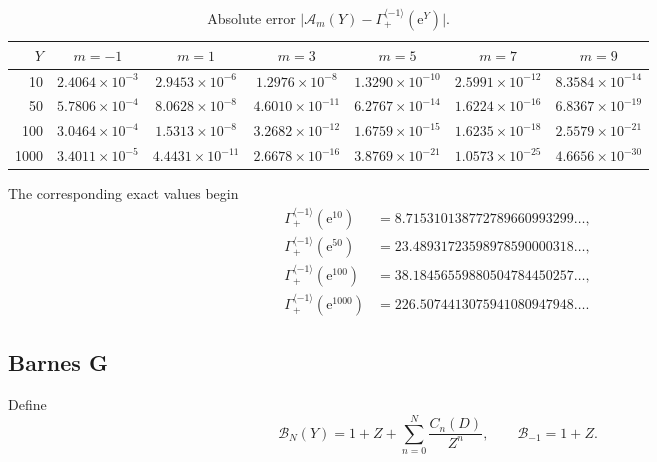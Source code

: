 \documentclass[11pt,a4paper]{article}
\numberwithin{equation}{section}
\theoremstyle{definition}
\theoremstyle{remark}
\newcommand{\e}{\mathrm e}
\newcommand{\cinv}{\langle-1\rangle}
\begin{document}
\begin{table}[htbp]
\centering
\caption{Absolute error \(\lvert\mathcal A_m(Y)-\Gamma_+^{\cinv}(\e^Y)\rvert\).}
\label{tab:gamma-errors}
\scriptsize
\setlength{\tabcolsep}{3.2pt}
\begin{tabular}{rcccccc}
\toprule
\(Y\) & \(m=-1\) & \(m=1\) & \(m=3\) & \(m=5\) & \(m=7\) & \(m=9\)\\
\midrule
10
& \(2.4064\!\times10^{-3}\) & \(2.9453\!\times10^{-6}\)
& \(1.2976\!\times10^{-8}\) & \(1.3290\!\times10^{-10}\)
& \(2.5991\!\times10^{-12}\) & \(8.3584\!\times10^{-14}\)\\
50
& \(5.7806\!\times10^{-4}\) & \(8.0628\!\times10^{-8}\)
& \(4.6010\!\times10^{-11}\) & \(6.2767\!\times10^{-14}\)
& \(1.6224\!\times10^{-16}\) & \(6.8367\!\times10^{-19}\)\\
100
& \(3.0464\!\times10^{-4}\) & \(1.5313\!\times10^{-8}\)
& \(3.2682\!\times10^{-12}\) & \(1.6759\!\times10^{-15}\)
& \(1.6235\!\times10^{-18}\) & \(2.5579\!\times10^{-21}\)\\
1000
& \(3.4011\!\times10^{-5}\) & \(4.4431\!\times10^{-11}\)
& \(2.6678\!\times10^{-16}\) & \(3.8769\!\times10^{-21}\)
& \(1.0573\!\times10^{-25}\) & \(4.6656\!\times10^{-30}\)\\
\bottomrule
\end{tabular}
\end{table}

The corresponding exact values begin
\begin{align*}
 \Gamma_+^{\cinv}(\e^{10})&=8.715310138772789660993299\ldots,\\
 \Gamma_+^{\cinv}(\e^{50})&=23.48931723598978590000318\ldots,\\
 \Gamma_+^{\cinv}(\e^{100})&=38.18456559880504784450257\ldots,\\
 \Gamma_+^{\cinv}(\e^{1000})&=226.5074413075941080947948\ldots.
\end{align*}

\subsection{Barnes G}

Define
\begin{equation}
 \mathcal B_N(Y)=1+Z+\sum_{n=0}^{N}\frac{C_n(D)}{Z^n},
 \qquad \mathcal B_{-1}=1+Z.
 \label{eq:B-trunc}
\end{equation}
\end{document}

